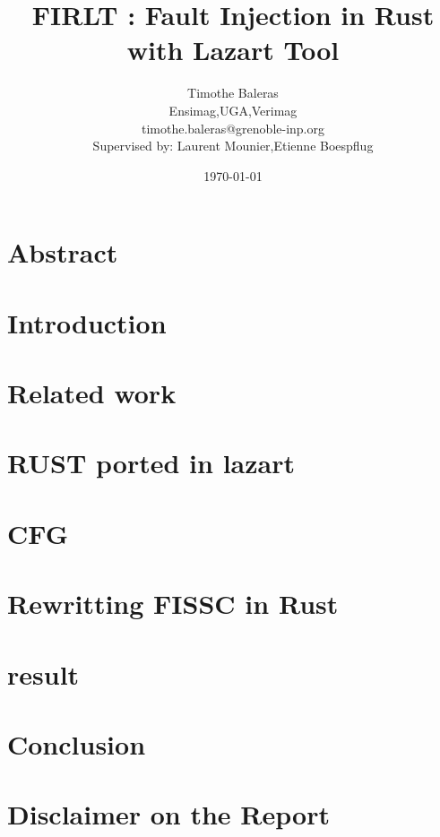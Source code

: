 \documentclass{article}
\title{FIRLT : Fault Injection in Rust with Lazart Tool}
\author{
        Timothe Baleras
        \\
        \smallskip
        Ensimag,UGA,Verimag
        \\
        \smallskip
        timothe.baleras@grenoble-inp.org \\
        \bigskip
        Supervised by: Laurent Mounier,Etienne Boespflug
        }
\date{\today}
\begin{document}
\twocolumn
\maketitle

\section{Abstract}

\section{Introduction}


\section{Related work}




\section{RUST ported in lazart}


\section{CFG}


\section{Rewritting FISSC in Rust}



\section{result}

\section{Conclusion}

\section*{\textbf{Disclaimer on the Report}}
\end{document}
